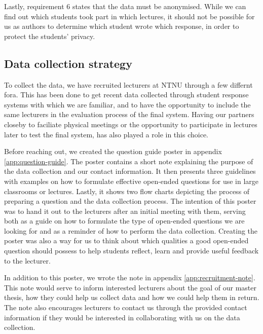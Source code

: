 Lastly, requirement 6 states that the data must be anonymised. While we can find out which students took part in which lectures, it should not be possible for us as authors to determine which student wrote which response, in order to protect the students' privacy.


\subsection{Data collection strategy}
To collect the data, we have recruited lecturers at NTNU through a few differnt fora. This has been done to get recent data collected through student response systems with which we are familiar, and to have the opportunity to include the same lecturers in the evaluation process of the final system. Having our partners closeby to faciliate physical meetings or the opportunity to participate in lectures later to test the final system, has also played a role in this choice.

Before reaching out, we created the question guide poster in appendix \ref{app:question-guide}. The poster contains a short note explaining the purpose of the data collection and our contact information. It then presents three guidelines with examples on how to formulate effective open-ended questions for use in large classrooms or lectures. Lastly, it shows two flow charts depicting the process of preparing a question and the data collection process. The intention of this poster was to hand it out to the lecturers after an initial meeting with them, serving both as a guide on how to formulate the type of open-ended questions we are looking for and as a reminder of how to perform the data collection. Creating the poster was also a way for us to think about which qualities a good open-ended question should possess to help students reflect, learn and provide useful feedback to the lecturer.

In addition to this poster, we wrote the note in appendix \ref{app:recruitment-note}. This note would serve to inform interested lecturers about the goal of our master thesis, how they could help us collect data and how we could help them in return. The note also encourages lecturers to contact us through the provided contact information if they would be interested in collaborating with us on the data collection.

